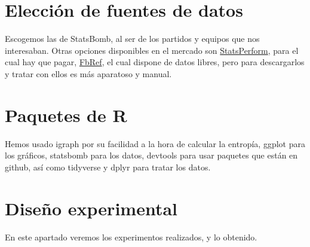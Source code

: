 \section{Elección de fuentes de datos}
Escogemos las de StatsBomb, al ser de los partidos y equipos que nos interesaban. Otras opciones disponibles en 
el mercado son \href{https://www.statsperform.com/}{StatsPerform}, para el cual hay que pagar, 
\href{https://fbref.com/en/}{FbRef}, el cual dispone de datos libres, pero para descargarlos y tratar con ellos 
es más aparatoso y manual.

\section{Paquetes de R}
Hemos usado igraph por su facilidad a la hora de calcular la entropía, ggplot para los gráficos, statsbomb para 
los datos, devtools para usar paquetes que están en github, así como tidyverse y dplyr para tratar los datos.

\section{Diseño experimental}
En este apartado veremos los experimentos realizados, y lo obtenido.


